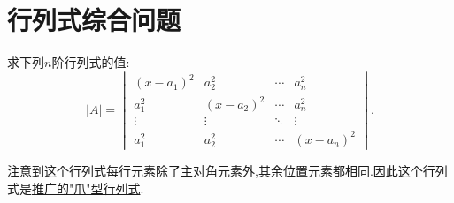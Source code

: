 \documentclass[../../main.tex]{subfiles}
\begin{document}
\section{行列式综合问题}

\begin{example}
求下列$n$阶行列式的值:
\[
\left| A \right|=\begin{vmatrix}
(x - a_1)^2 & a_2^2 & \cdots & a_n^2 \\
a_1^2 & (x - a_2)^2 & \cdots & a_n^2 \\
\vdots & \vdots & \ddots & \vdots \\
a_1^2 & a_2^2 & \cdots & (x - a_n)^2
\end{vmatrix}.
\]
\end{example}
\begin{note}
注意到这个行列式每行元素除了主对角元素外,其余位置元素都相同.因此这个行列式是\hyperref["爪"型行列式的推广]{推广的"爪"型行列式}.
\end{note}
\end{document}
